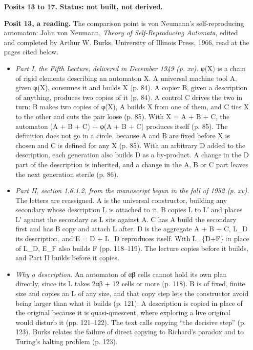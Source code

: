 \textbf{Posits 13 to 17. Status: not built, not derived.}

\textbf{Posit 13, a reading.} The comparison point is von Neumann's self-reproducing automaton: John von Neumann, \emph{Theory of Self-Reproducing Automata}, edited and completed by Arthur W. Burks, University of Illinois Press, 1966, read at the pages cited below.

\begin{itemize}
\item \emph{Part I, the Fifth Lecture, delivered in December 1949 (p. xv).} φ(X) is a chain of rigid elements describing an automaton X. A universal machine tool A, given φ(X), consumes it and builds X (p. 84). A copier B, given a description of anything, produces two copies of it (p. 84). A control C drives the two in turn: B makes two copies of φ(X), A builds X from one of them, and C ties X to the other and cuts the pair loose (p. 85). With X = A + B + C, the automaton (A + B + C) + φ(A + B + C) produces itself (p. 85). The definition does not go in a circle, because A and B are fixed before X is chosen and C is defined for any X (p. 85). With an arbitrary D added to the description, each generation also builds D as a by-product. A change in the D part of the description is inherited, and a change in the A, B or C part leaves the next generation sterile (p. 86).
\item \emph{Part II, section 1.6.1.2, from the manuscript begun in the fall of 1952 (p. xv).} The letters are reassigned. A is the universal constructor, building any secondary whose description L is attached to it. B copies L to L′ and places L′ against the secondary as L sits against A. C has A build the secondary first and has B copy and attach L after. D is the aggregate A + B + C, L\_\allowbreak{}D its description, and E = D + L\_\allowbreak{}D reproduces itself. With L\_\allowbreak{}\{D+F\} in place of L\_\allowbreak{}D, E\_\allowbreak{}F also builds F (pp. 118–119). The lecture copies before it builds, and Part II builds before it copies.
\item \emph{Why a description.} An automaton of αβ cells cannot hold its own plan directly, since its L takes 2αβ + 12 cells or more (p. 118). B is of fixed, finite size and copies an L of any size, and that copy step lets the constructor avoid being larger than what it builds (p. 121). A description is copied in place of the original because it is quasi-quiescent, where exploring a live original would disturb it (pp. 121–122). The text calls copying “the decisive step” (p. 123). Burks relates the failure of direct copying to Richard's paradox and to Turing's halting problem (p. 123).

\end{itemize}
